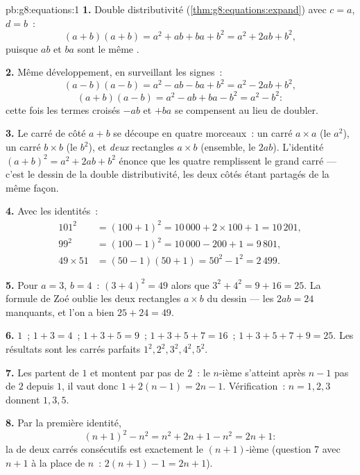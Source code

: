 \begin{solution}{pb:g8:equations:1}
\textbf{1.} Double distributivité
(\cref{thm:g8:equations:expand}) avec $c = a$, $d = b$~:
\[
(a + b)(a + b) = a^2 + ab + ba + b^2 = a^2 + 2ab + b^2 ,
\]
puisque $ab$ et $ba$ sont le même .

\textbf{2.} Même développement, en surveillant les signes~:
\[
(a - b)(a - b) = a^2 - ab - ba + b^2 = a^2 - 2ab + b^2 ,
\]
\[
(a + b)(a - b) = a^2 - ab + ba - b^2 = a^2 - b^2 :
\]
cette fois les termes croisés $-ab$ et $+ba$ se compensent au lieu
de doubler.

\textbf{3.} Le carré de côté $a + b$ se découpe en quatre morceaux~:
un carré $a \times a$ (le $a^2$), un carré $b \times b$ (le $b^2$),
et \emph{deux} rectangles $a \times b$ (ensemble, le $2ab$).
L'identité $(a+b)^2 = a^2 + 2ab + b^2$ énonce que les quatre 
remplissent le grand carré --- c'est le dessin de la double
distributivité, les deux côtés étant partagés de la même façon.

\textbf{4.} Avec les identités~:
\begin{align*}
101^2 &= (100 + 1)^2 = 10\,000 + 2 \times 100 + 1 = 10\,201, \\
99^2 &= (100 - 1)^2 = 10\,000 - 200 + 1 = 9\,801, \\
49 \times 51 &= (50 - 1)(50 + 1) = 50^2 - 1^2 = 2\,499 .
\end{align*}

\textbf{5.} Pour $a = 3$, $b = 4$~: $(3 + 4)^2 = 49$ alors que
$3^2 + 4^2 = 9 + 16 = 25$. La formule de Zoé oublie les deux
rectangles $a \times b$ du dessin --- les $2ab = 24$ manquants, et
l'on a bien $25 + 24 = 49$.

\textbf{6.} $1$~; $1 + 3 = 4$~; $1 + 3 + 5 = 9$~;
$1 + 3 + 5 + 7 = 16$~; $1 + 3 + 5 + 7 + 9 = 25$. Les résultats sont
les carrés parfaits $1^2, 2^2, 3^2, 4^2, 5^2$.

\textbf{7.} Les  partent de $1$ et montent par pas de
$2$~: le $n$-ième s'atteint après $n - 1$ pas de $2$ depuis $1$, il
vaut donc $1 + 2(n - 1) = 2n - 1$. Vérification~: $n = 1, 2, 3$
donnent $1, 3, 5$.

\textbf{8.} Par la première identité,
\[
(n + 1)^2 - n^2 = n^2 + 2n + 1 - n^2 = 2n + 1 :
\]
la  de deux carrés consécutifs est exactement le
$(n+1)$-ième  (question 7 avec $n + 1$ à la place de
$n$~: $2(n+1) - 1 = 2n + 1$).


\end{solution}

